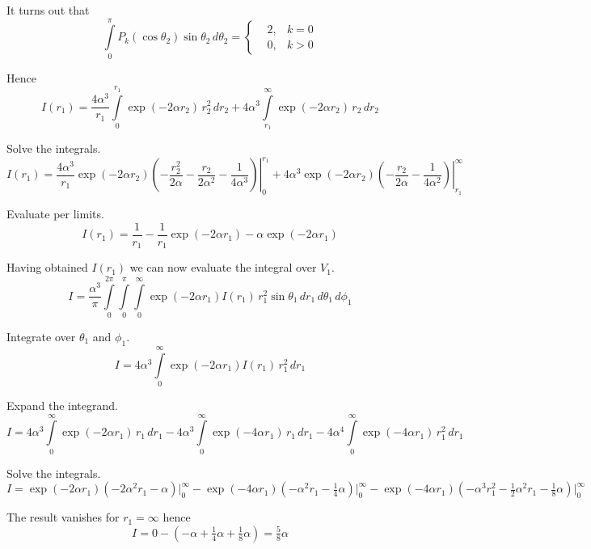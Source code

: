 \documentclass[12pt]{article}
\begin{document}
\noindent
It turns out that
\begin{equation*}
\int\limits_0^\pi P_k(\cos\theta_2)\sin\theta_2\,d\theta_2=
\left\{
\begin{aligned}
&2, & k=0
\\
&0, & k>0
\end{aligned}\right.
\end{equation*}

\noindent
Hence
\begin{equation*}
I(r_1)=
\frac{4\alpha^3}{r_1}\int\limits_0^{r_1}\exp(-2\alpha r_2)\,r_2^2\,dr_2
+4\alpha^3\int\limits_{r_1}^\infty\exp(-2\alpha r_2)\,r_2\,dr_2
\end{equation*}

\noindent
Solve the integrals.
\begin{equation*}
I(r_1)=
\frac{4\alpha^3}{r_1}
\left.
\exp(-2\alpha r_2)\left(-\frac{r_2^2}{2\alpha}-\frac{r_2}{2\alpha^2}-\frac{1}{4\alpha^3}
\right)\right|_0^{r_1}
+4\alpha^3\left.\exp(-2\alpha r_2)\left(-\frac{r_2}{2\alpha}-\frac{1}{4\alpha^2}\right)\right|_{r_1}^\infty
\end{equation*}

\noindent
Evaluate per limits.
\begin{equation*}
I(r_1)=\frac{1}{r_1}-\frac{1}{r_1}\exp(-2\alpha r_1)-\alpha\exp(-2\alpha r_1)
\end{equation*}

\noindent
Having obtained $I(r_1)$ we can now evaluate the integral over $V_1$.
\begin{equation*}
I=\frac{\alpha^3}{\pi}\int\limits_0^{2\pi}\int\limits_0^\pi\int\limits_0^\infty
\exp(-2\alpha r_1)I(r_1)\,r_1^2\sin\theta_1\,dr_1\,d\theta_1\,d\phi_1
\end{equation*}

\noindent
Integrate over $\theta_1$ and $\phi_1$.
\begin{equation*}
I=4\alpha^3\int\limits_0^\infty
\exp(-2\alpha r_1)I(r_1)\,r_1^2\,dr_1
\end{equation*}

\noindent
Expand the integrand.
\begin{equation*}
I=4\alpha^3\int\limits_0^\infty\exp(-2\alpha r_1)\,r_1\,dr_1
-4\alpha^3\int\limits_0^\infty\exp(-4\alpha r_1)\,r_1\,dr_1
-4\alpha^4\int\limits_0^\infty\exp(-4\alpha r_1)\,r_1^2\,dr_1
\end{equation*}

\noindent
Solve the integrals.
{\small
\begin{equation*}
I=
\exp(-2\alpha r_1)\left(-2\alpha^2r_1-\alpha\right)\bigg|_0^\infty
{}-\exp(-4\alpha r_1)(-\alpha^2r_1-\tfrac{1}{4}\alpha)\bigg|_0^\infty
{}-\exp(-4\alpha r_1)\left(-\alpha^3r_1^2-\tfrac{1}{2}\alpha^2r_1-\tfrac{1}{8}\alpha\right)\bigg|_0^\infty
\end{equation*}
}

\noindent
The result vanishes for $r_1=\infty$ hence
\begin{equation*}
I=0-\left(-\alpha+\tfrac{1}{4}\alpha+\tfrac{1}{8}\alpha\right)=\tfrac{5}{8}\alpha
\end{equation*}
\end{document}
